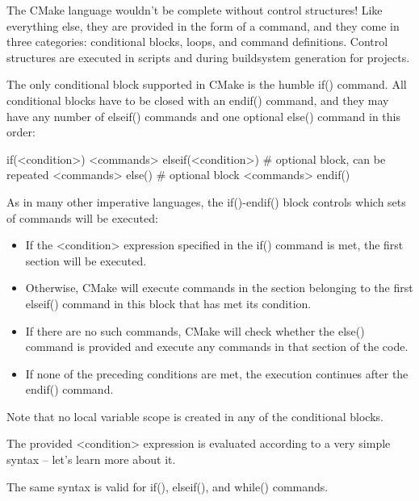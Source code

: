 The CMake language wouldn’t be complete without control structures! Like everything else, they are provided in the form of a command, and they come in three categories: conditional blocks, loops, and command definitions. Control structures are executed in scripts and during buildsystem generation for projects.


The only conditional block supported in CMake is the humble if() command. All conditional blocks have to be closed with an endif() command, and they may have any number of elseif() commands and one optional else() command in this order:

\begin{shell}
if(<condition>)
    <commands>
elseif(<condition>) # optional block, can be repeated
    <commands>
else() # optional block
    <commands>
endif()
\end{shell}

As in many other imperative languages, the if()-endif() block controls which sets of commands will be executed:

\begin{itemize}
\item
If the <condition> expression specified in the if() command is met, the first section will be executed.

\item
Otherwise, CMake will execute commands in the section belonging to the first elseif() command in this block that has met its condition.

\item
If there are no such commands, CMake will check whether the else() command is provided and execute any commands in that section of the code.

\item
If none of the preceding conditions are met, the execution continues after the endif() command.
\end{itemize}

Note that no local variable scope is created in any of the conditional blocks.

The provided <condition> expression is evaluated according to a very simple syntax – let’s learn more about it.


The same syntax is valid for if(), elseif(), and while() commands.



